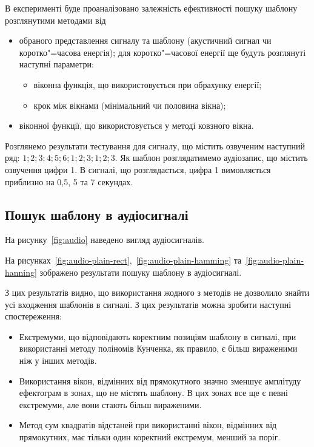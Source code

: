     В експерименті буде проаналізовано залежність ефективності пошуку шаблону розглянутими методами від
    \begin{itemize}
        \item обраного представлення сигналу та шаблону (акустичний сигнал чи коротко"=часова енергія);
            для коротко"=часової енергії ще будуть розглянуті наступні параметри:
            \begin{itemize}
                \item віконна функція, що використовується при обрахунку енергії;
                \item крок між вікнами (мінімальний чи половина вікна);
            \end{itemize}
        \item віконної функції, що використовується у методі ковзного вікна.
    \end{itemize}

    Розглянемо результати тестування для сигналу, що містить озвученим наступний ряд: $1;2;3;4;5;6;1;2;3;1;2;3$.
    Як шаблон розглядатимемо аудіозапис, що містить озвучення цифри 1.
    В сигналі, що розглядається, цифра 1 вимовляється приблизно на 0,5, 5 та 7 секундах.

    \subsection{Пошук шаблону в аудіосигналі}
        На рисунку~\ref{fig:audio} наведено вигляд аудіосигналів.

        На рисунках~\ref{fig:audio-plain-rect},~\ref{fig:audio-plain-hamming} та~\ref{fig:audio-plain-hanning}
        зображено результати пошуку шаблону в аудіосигналі.

        З цих результатів видно, що використання жодного з методів не дозволило знайти усі входження шаблонів в
        сигналі.
        З цих результатів можна зробити наступні спостереження:
        \begin{itemize}
            \item Екстремуми, що відповідають коректним позиціям шаблону в сигналі, при використанні методу поліномів
                Кунченка, як правило, є більш вираженими ніж у інших методів.
            \item Використання вікон, відмінних від прямокутного значно зменшує амплітуду ефектограм в зонах, що не
                містять шаблону.
                В цих зонах все ще є певні екстремуми, але вони стають більш вираженими.
            \item Метод сум квадратів відстаней при використанні вікон, відмінних від прямокутних, має тільки один
                коректний екстремум, менший за поріг.
        \end{itemize}

